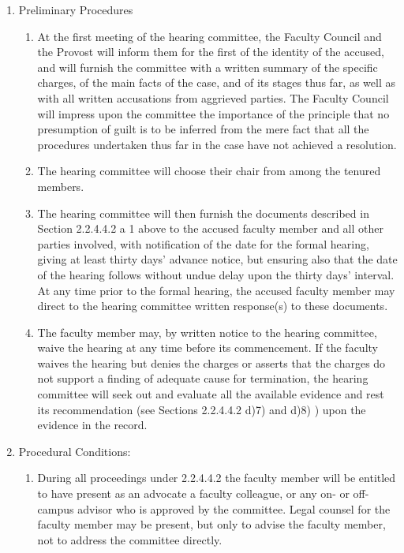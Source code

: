 \documentclass[letterpaper, 11pt]{article}
\begin{document}
				\begin{enumerate}[label=\alph*)]
					\item{Preliminary Procedures
						\begin{enumerate}[label=\arabic*)]
							\item{At the first meeting of the hearing committee, the Faculty Council and the Provost will inform them for the first of the identity of the accused, and will furnish the committee with a written summary of the specific charges, of the main facts of the case, and of its stages thus far, as well as with all written accusations from aggrieved parties. The Faculty Council will impress upon the committee the importance of the principle that no presumption of guilt is to be inferred from the mere fact that all the procedures undertaken thus far in the case have not achieved a resolution.}
							\item{The hearing committee will choose their chair from among the tenured members.}
							\item{The hearing committee will then furnish the documents described in Section 2.2.4.4.2 a 1 above to the accused faculty member and all other parties involved, with notification of the date for the formal hearing, giving at least thirty days' advance notice, but ensuring also that the date of the hearing follows without undue delay upon the thirty days' interval.  At any time prior to the formal hearing, the accused faculty member may direct to the hearing committee written response(s) to these documents.}
							\item{The faculty member may, by written notice to the hearing committee, waive the hearing at any time before its commencement.  If the faculty waives the hearing but denies the charges or asserts that the charges do not support a finding of adequate cause for termination, the hearing committee will seek out and evaluate all the available evidence and rest its recommendation (see Sections 2.2.4.4.2 d)7) and d)8) ) upon the evidence in the record.}
						\end{enumerate}
					}
					\item{Procedural Conditions:
						\begin{enumerate}[label=\arabic*)]
							\item{During all proceedings under 2.2.4.4.2 the faculty member will be entitled to have present as an advocate a faculty colleague, or any on- or off-campus advisor who is approved by the committee.  Legal counsel for the faculty member may be present, but only to advise the faculty member, not to address the committee directly.}

\end{enumerate}}
\end{enumerate}
\end{document}
